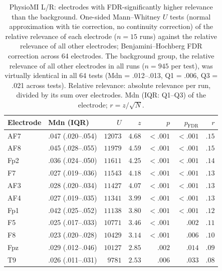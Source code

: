 \begin{table}[ht]
\centering
\small
\setlength{\tabcolsep}{4pt}
\caption{PhysioMI L/R: electrodes with FDR-significantly higher relevance than the background. One-sided Mann--Whitney $U$ tests (normal approximation with tie correction, no continuity correction) of the relative relevance of each electrode ($n = 15$ runs) against the relative relevance of all other electrodes; Benjamini--Hochberg FDR correction across 64 electrodes. The background group, the relative relevance of all other electrodes in all runs ($n = 945$ per test), was virtually identical in all 64 tests (Mdn = .012--.013, Q1 = .006, Q3 = .021 across tests). Relative relevance: absolute relevance per run, divided by its sum over electrodes. Mdn (IQR: Q1--Q3) of the electrode; $r = z / \sqrt{N}$.}
\label{tab:physiomi_electrode_mwu}
\begin{tabular}{llrrrrr}
\toprule
Electrode & Mdn (IQR) & $U$ & $z$ & $p$ & $p_{\mathrm{FDR}}$ & $r$ \\
\midrule
AF7 & .047 (.020--.054) & $12073$ & $4.68$ & $< .001$ & $< .001$ & $.15$ \\
AF8 & .045 (.028--.055) & $11979$ & $4.59$ & $< .001$ & $< .001$ & $.15$ \\
Fp2 & .036 (.024--.050) & $11611$ & $4.25$ & $< .001$ & $< .001$ & $.14$ \\
F7 & .027 (.019--.036) & $11543$ & $4.18$ & $< .001$ & $< .001$ & $.13$ \\
AF3 & .028 (.020--.034) & $11427$ & $4.07$ & $< .001$ & $< .001$ & $.13$ \\
AF4 & .027 (.019--.035) & $11341$ & $3.99$ & $< .001$ & $< .001$ & $.13$ \\
Fp1 & .042 (.025--.052) & $11138$ & $3.80$ & $< .001$ & $< .001$ & $.12$ \\
F5 & .025 (.017--.033) & $10771$ & $3.46$ & $< .001$ & $.002$ & $.11$ \\
F8 & .023 (.020--.028) & $10429$ & $3.14$ & $< .001$ & $.006$ & $.10$ \\
Fpz & .029 (.012--.046) & $10127$ & $2.85$ & $.002$ & $.014$ & $.09$ \\
T9 & .026 (.011--.031) & $9781$ & $2.53$ & $.006$ & $.033$ & $.08$ \\
\bottomrule
\end{tabular}
\end{table}
